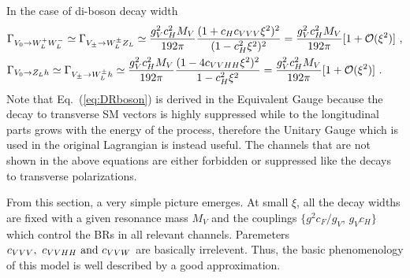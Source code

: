 \newline In the case of di-boson decay width
\begin{align}
  \label{eq:DRboson}
  &\Gamma_{V_{0}\rightarrow W_{L}^{+}W_{L}^{-}}\simeq\Gamma_{V_{\pm}\rightarrow W_{L}^{\pm}Z_{L}}\simeq\frac{g_{V}^{2}c_{H}^{2}M_{V}}{192\pi}\frac{(1+c_{H}c_{VVV}\xi^{2})^{2}}{(1-c_{H}^{2}\xi^{2})^{2}}=\frac{g_{V}^{2}c_{H}^{2}M_{V}}{192\pi}[1+\mathcal{O}(\xi^{2})]\textup{ ,}\nonumber\\
  &\Gamma_{V_{0}\rightarrow Z_{L}h}\simeq\Gamma_{V_{\pm}\rightarrow W_{L}^{\pm}h}\simeq\frac{g_{V}^{2}c_{H}^{2}M_{V}}{192\pi}\frac{(1-4c_{VVHH}\xi^{2})^{2}}{1-c_{H}^{2}\xi^{2}}=\frac{g_{V}^{2}c_{H}^{2}M_{V}}{192\pi}[1+\mathcal{O}(\xi^{2})]\textup{ .}\nonumber\\
\end{align}
Note that Eq.~(\ref{eq:DRboson}) is derived in the Equivalent Gauge\cite{EquivGauge} because the decay to transverse SM vectors is highly suppressed while to the longitudinal parts grows with the energy of the process, therefore the Unitary Gauge which is used in the original Lagrangian is instead useful. The channels that are not shown in the above equations are either forbidden or suppressed like the decays to transverse polarizations.

From this section, a very simple picture emerges. At small $\xi$, all the decay widths are fixed with a given resonance mass $M_{V}$ and the couplings $\{g^{2}c_{F}/g_{V}$, $g_{V}c_{H}\}$ which control the BRs in all relevant channels. Paremeters $c_{VVV},\textup{ } c_{VVHH}\textup{ and }c_{VVW}$ are basically irrelevent. Thus, the basic phenomenology of this model is well described by a good approximation.

